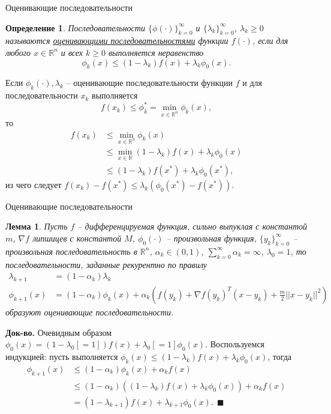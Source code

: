 \documentclass[10pt, handout]{beamer}
\newcounter{lm}
\newcounter{def}
\newtheorem{lemma_ru}[lm]{Лемма}
\newtheorem{definition_ru}{Определение}[def]
\begin{document}
\begin{frame}{Оценивающие последовательности}
\begin{definition_ru}
Последовательности $\{\phi(\cdot)\}_{k=0}^\infty$ и $\{\lambda_k\}_{k=0}^\infty$, $\lambda_k\geq 0$ называются \underline{оценивающими последовательностями} функции $f(\cdot)$, если для любого $x\in \mathbb{R}^n$ и всех $k\geq 0$ выполняется неравенство
$$
\phi_k(x)\leq (1-\lambda_k)f(x)+\lambda_k\phi_0(x).
$$
\end{definition_ru}
\pause
Если $\phi_k(\cdot), \lambda_k$ -- оценивающие последовательности функции $f$ и для последовательности $x_k$ выполняется 
$$
f(x_k)\leq \phi_k^*=\min_{x\in \mathbb{R}^n}\phi_k(x),
$$
то 
\begin{align*}
f(x_k)&\leq \min_{x\in \mathbb{R}^n}\phi_k(x)\\
&\leq \min_{x\in\mathbb{R}}(1-\lambda_k)f(x)+\lambda_k\phi_0(x)\\
&\leq (1-\lambda_k) f(x^*)+\lambda_k\phi_0(x^*),
\end{align*}
из чего следует $f(x_k)-f(x^*)\leq \lambda_k(\phi_0(x^*)-f(x^*))$.
\end{frame}

\begin{frame}{Оценивающие последовательности}
\begin{lemma_ru}
Пусть $f$ -- дифференцируемая функция, сильно выпуклая с константой $m$, $\nabla f$ липшицев с константой $M$, $\phi_0(\cdot)$ -- произвольная функция, $\{y_k\}_{k=0}^\infty$ -- произвольная последовательность в $\mathbb{R}^n$, $\alpha_k\in (0, 1)$, $\sum_{k=0}^\infty\alpha_k=\infty$, $\lambda_0=1$, то последовательности, заданные рекурентно по правилу
\begin{align}\label{estimate_seq_reccurence}
\lambda_{k+1}&=(1-\alpha_k)\lambda_k\nonumber\\
\phi_{k+1}(x)&=(1-\alpha_k)\phi_k(x)+\alpha_k\left(f(y_k)+\nabla f(y_k)^T(x-y_k)+\frac{m}{2}||x-y_k||^2\right)
\end{align}
образуют оценивающие последовательности.
\end{lemma_ru}
\pause
\textbf{Док-во.} Очевидным образом $\phi_0(x)=(1-\lambda_0[=1])f(x)+\lambda_0[=1]\phi_0(x)$. Воспользуемся индукцией: пусть выполняется $\phi_k(x)\leq (1-\lambda_k)f(x)+\lambda_k\phi_0(x)$, тогда
\pause
\begin{align*}
\phi_{k+1}(x)&\leq (1-\alpha_k)\phi_k(x)+\alpha_kf(x)\\
&\leq (1-\alpha_k)((1-\lambda_k)f(x)+\lambda_k\phi_0(x))+\alpha_kf(x)\\
&=(1-\lambda_{k+1})f(x)+\lambda_{k+1}\phi_0(x).~~\blacksquare
\end{align*}
 
\end{frame}
\end{document}
